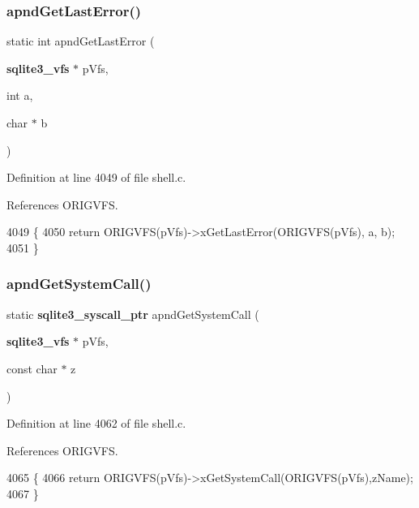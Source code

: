 \subsubsection{apnd\+Get\+Last\+Error()}
{\footnotesize\ttfamily static int apnd\+Get\+Last\+Error (\begin{DoxyParamCaption}\item[{\textbf{ sqlite3\+\_\+vfs} $\ast$}]{p\+Vfs,  }\item[{int}]{a,  }\item[{char $\ast$}]{b }\end{DoxyParamCaption})\hspace{0.3cm}{\ttfamily [static]}}



Definition at line 4049 of file shell.\+c.



References O\+R\+I\+G\+V\+FS.


\begin{DoxyCode}
4049                                                               \{
4050   \textcolor{keywordflow}{return} ORIGVFS(pVfs)->xGetLastError(ORIGVFS(pVfs), a, b);
4051 \}
\end{DoxyCode}
\mbox{\label{shell_8c_ad5ed9227a9fbb33ac59e9d2ac1165fcb}} 
\subsubsection{apnd\+Get\+System\+Call()}
{\footnotesize\ttfamily static \textbf{ sqlite3\+\_\+syscall\+\_\+ptr} apnd\+Get\+System\+Call (\begin{DoxyParamCaption}\item[{\textbf{ sqlite3\+\_\+vfs} $\ast$}]{p\+Vfs,  }\item[{const char $\ast$}]{z }\end{DoxyParamCaption})\hspace{0.3cm}{\ttfamily [static]}}



Definition at line 4062 of file shell.\+c.



References O\+R\+I\+G\+V\+FS.


\begin{DoxyCode}
4065  \{
4066   \textcolor{keywordflow}{return} ORIGVFS(pVfs)->xGetSystemCall(ORIGVFS(pVfs),zName);
4067 \}
\end{DoxyCode}
\mbox{\label{shell_8c_ad2daeaaf7d56eb5d01d86ab5df99069e}} 
